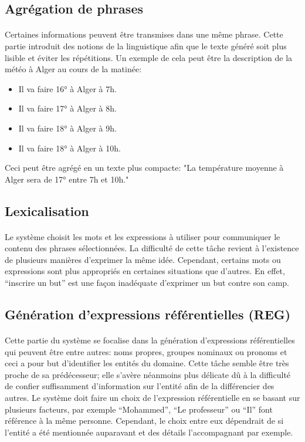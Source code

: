	\subsection{Agrégation de phrases}
	\paragraph{}
	Certaines informations peuvent être transmises dans une même phrase. Cette partie introduit des notions de la linguistique afin que le texte généré soit plus lisible et éviter les répétitions. Un exemple de cela peut être la description de la météo à Alger au cours de la matinée:
	\begin{itemize}
		\item Il va faire 16° à Alger à 7h.
		\item Il va faire 17° à Alger à 8h.
		\item Il va faire 18° à Alger à 9h.
		\item Il va faire 18° à Alger à 10h.
	\end{itemize}
	Ceci peut être agrégé en un texte plus compacte: "La température moyenne à Alger sera de 17° entre 7h et 10h."
	
	\subsection{Lexicalisation}
	\paragraph{}Le système choisit les mots et les expressions à utiliser pour communiquer le contenu des phrases sélectionnées. La difficulté de cette tâche revient à l’existence de plusieurs manières d’exprimer la même idée. Cependant, certains mots ou expressions sont plus appropriés en certaines situations que d’autres. En effet, “inscrire un but” est une façon inadéquate d’exprimer un but contre son camp\cite{Gatt2018}.
	
	\subsection{Génération d’expressions référentielles (REG)}
	\paragraph{}Cette partie du système se focalise dans la génération d’expressions référentielles qui peuvent être entre autres: noms propres, groupes nominaux ou pronoms et ceci a pour but d’identifier les entités du domaine. Cette tâche semble être très proche de sa prédécesseur; elle s’avère néanmoins plus délicate dû à la difficulté de confier suffisamment d’information sur l’entité afin de la différencier des autres\cite{Reiter:1997}. Le système doit faire un choix de l’expression référentielle en se basant sur plusieurs facteurs, par exemple “Mohammed”, “Le professeur” ou “Il” font référence à la même personne. Cependant, le choix entre eux dépendrait de si l’entité a été mentionnée auparavant et des détails l’accompagnant par exemple. 
	
